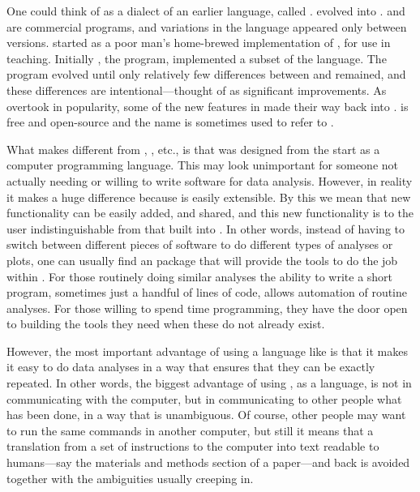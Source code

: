 \documentclass[krantz2]{krantz}\usepackage{knitr}
\begin{document}
One could think of \Rlang as a dialect of an earlier language, called \Slang. \Slang evolved into \Splang \autocite{Becker1988}. \Slang and \Splang are commercial programs, and variations in the language appeared only between versions. \Rlang started as a poor man's home-brewed implementation of \Slang, for use in teaching. Initially \Rpgrm, the program, implemented a subset of the \Slang language. The \Rpgrm program evolved until only relatively few differences between \Slang and \Rlang remained, and these differences are intentional---thought of as significant improvements. As \Rlang overtook \Splang in popularity, some of the new features in \Rlang made their way back into \Splang. \Rpgrm is free and open-source and the name  is sometimes used to refer to \Rpgrm.

What makes \Rlang different from , , etc., is that \Slang was designed from the start as a computer programming language. This may look unimportant for someone not actually needing or willing to write software for data analysis. However, in reality it makes a huge difference because \Rlang is easily extensible. By this we mean that new functionality can be easily added, and shared, and this new functionality is to the user indistinguishable from that built into \Rlang. In other words, instead of having to switch between different pieces of software to do different types of analyses or plots, one can usually find an \Rlang package that will provide the tools to do the job within \Rlang. For those routinely doing similar analyses the ability to write a short program, sometimes just a handful of lines of code, allows automation of routine analyses. For those willing to spend time programming, they have the door open to building the tools they need when these do not already exist.

However, the most important advantage of using a language like \Rlang is that it makes it easy to do data analyses in a way that ensures that they can be exactly repeated. In other words, the biggest advantage of using \Rlang, as a language, is not in communicating with the computer, but in communicating to other people what has been done, in a way that is unambiguous. Of course, other people may want to run the same commands in another computer, but still it means that a translation from a set of instructions to the computer into text readable to humans---say the materials and methods section of a paper---and back is avoided together with the ambiguities usually creeping in.
\end{document}
